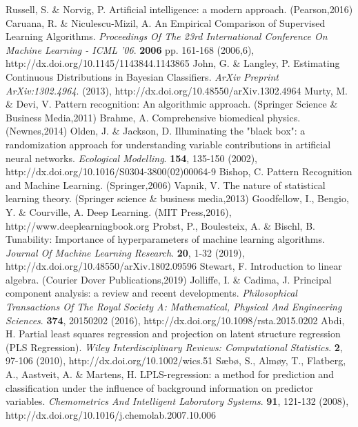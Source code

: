 \let\LaTeXcline\cline\documentclass[sn-mathphys-num]{sn-jnl}\let\cline\LaTeXcline
\begin{document}
\begin{thebibliography}{00}
Russell, S. \& Norvig, P. Artificial intelligence: a modern approach. (Pearson,2016)
Caruana, R. \& Niculescu-Mizil, A. An Empirical Comparison of Supervised Learning Algorithms. {\em Proceedings Of The 23rd International Conference On Machine Learning - ICML '06}. \textbf{2006} pp. 161-168 (2006,6), http://dx.doi.org/10.1145/1143844.1143865
John, G. \& Langley, P. Estimating Continuous Distributions in Bayesian Classifiers. {\em ArXiv Preprint ArXiv:1302.4964}. (2013), http://dx.doi.org/10.48550/arXiv.1302.4964
Murty, M. \& Devi, V. Pattern recognition: An algorithmic approach. (Springer Science & Business Media,2011)
Brahme, A. Comprehensive biomedical physics. (Newnes,2014)
Olden, J. \& Jackson, D. Illuminating the "black box": a randomization approach for understanding variable contributions in artificial neural networks. {\em Ecological Modelling}. \textbf{154}, 135-150 (2002), http://dx.doi.org/10.1016/S0304-3800(02)00064-9
Bishop, C. Pattern Recognition and Machine Learning. (Springer,2006)
Vapnik, V. The nature of statistical learning theory. (Springer science & business media,2013)
Goodfellow, I., Bengio, Y. \& Courville, A. Deep Learning. (MIT Press,2016), http://www.deeplearningbook.org
Probst, P., Boulesteix, A. \& Bischl, B. Tunability: Importance of hyperparameters of machine learning algorithms. {\em Journal Of Machine Learning Research}. \textbf{20}, 1-32 (2019), http://dx.doi.org/10.48550/arXiv.1802.09596
Stewart, F. Introduction to linear algebra. (Courier Dover Publications,2019)
Jolliffe, I. \& Cadima, J. Principal component analysis: a review and recent developments. {\em Philosophical Transactions Of The Royal Society A: Mathematical, Physical And Engineering Sciences}. \textbf{374}, 20150202 (2016), http://dx.doi.org/10.1098/rsta.2015.0202
Abdi, H. Partial least squares regression and projection on latent structure regression (PLS Regression). {\em Wiley Interdisciplinary Reviews: Computational Statistics}. \textbf{2}, 97-106 (2010), http://dx.doi.org/10.1002/wics.51
Sæbø, S., Almøy, T., Flatberg, A., Aastveit, A. \& Martens, H. LPLS-regression: a method for prediction and classification under the influence of background information on predictor variables. {\em Chemometrics And Intelligent Laboratory Systems}. \textbf{91}, 121-132 (2008), http://dx.doi.org/10.1016/j.chemolab.2007.10.006

\end{thebibliography}
\end{document}

